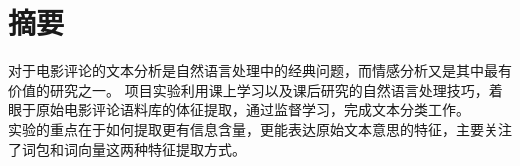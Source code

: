 \section{摘要}
对于电影评论的文本分析是自然语言处理中的经典问题，而情感分析又是其中最有价值的研究之一。
项目实验利用课上学习以及课后研究的自然语言处理技巧，着眼于原始电影评论语料库的体征提取，通过监督学习，完成文本分类工作。\\
实验的重点在于如何提取更有信息含量，更能表达原始文本意思的特征，主要关注了词包和词向量这两种特征提取方式。